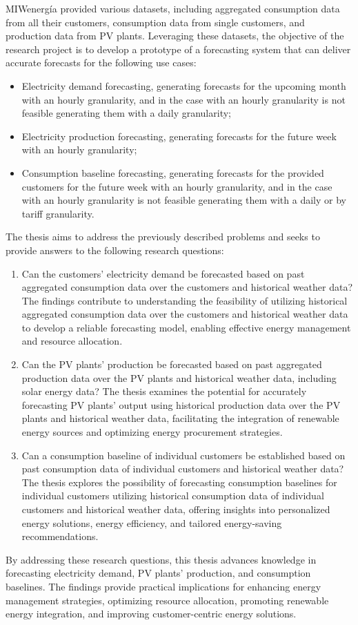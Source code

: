 MIWenergía provided various datasets, including aggregated consumption data from all their customers, consumption data from single customers, and production data from PV plants.
Leveraging these datasets, the objective of the research project is to develop a prototype of a forecasting system that can deliver accurate forecasts for the following use cases:
\begin{itemize}
  \item Electricity demand forecasting, generating forecasts for the upcoming month with an hourly granularity, and in the case with an hourly granularity is not feasible generating them with a daily granularity;
  \item Electricity production forecasting, generating forecasts for the future week with an hourly granularity;
  \item Consumption baseline forecasting, generating forecasts for the provided customers for the future week with an hourly granularity, and in the case with an hourly granularity is not feasible generating them with a daily or by tariff granularity.
\end{itemize}

The thesis aims to address the previously described problems and seeks to provide answers to the following research questions:
\begin{enumerate}
  \item Can the customers' electricity demand be forecasted based on past aggregated consumption data over the customers and historical weather data? The findings contribute to understanding the feasibility of utilizing historical aggregated consumption data over the customers and historical weather data to develop a reliable forecasting model, enabling effective energy management and resource allocation.
  \item Can the PV plants' production be forecasted based on past aggregated production data over the PV plants and historical weather data, including solar energy data? The thesis examines the potential for accurately forecasting PV plants' output using historical production data over the PV plants and historical weather data, facilitating the integration of renewable energy sources and optimizing energy procurement strategies.
  \item Can a consumption baseline of individual customers be established based on past consumption data of individual customers and historical weather data? The thesis explores the possibility of forecasting consumption baselines for individual customers utilizing historical consumption data of individual customers and historical weather data, offering insights into personalized energy solutions, energy efficiency, and tailored energy-saving recommendations.
\end{enumerate}
By addressing these research questions, this thesis advances knowledge in forecasting electricity demand, PV plants' production, and consumption baselines.
The findings provide practical implications for enhancing energy management strategies, optimizing resource allocation, promoting renewable energy integration, and improving customer-centric energy solutions.

